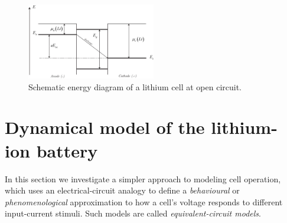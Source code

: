 \documentclass[11pt,a4paper]{article}
\numberwithin{equation}{section}
\theoremstyle{it}
\theoremstyle{definition}
\begin{document}
\begin{figure}[H]
	\centering
	\includegraphics[width = 0.5\textwidth, width = 400pt, angle = 0, keepaspectratio]{figures/lithium_ion_battery/lithium_ion_battery_1.eps}
	\captionsetup{width=0.5\textwidth}		
	\caption{Schematic energy diagram of a lithium cell at open circuit.}
	\label{litium_battery_energy}
\end{figure}


\section{Dynamical model of the lithium-ion battery}
In this section we investigate a simpler approach to modeling cell operation, which uses an electrical-circuit analogy to define a \textit{behavioural} or \textit{phenomenological} approximation to how a cell's voltage responds to different input-current stimuli. Such models are called \textit{equivalent-circuit models}.
\end{document}
